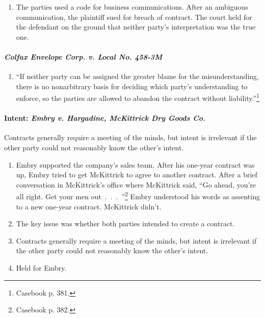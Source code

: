 \begin{enumerate}
    \item The parties used a code for business communications. After an 
    ambiguous communication, the plaintiff sued for breach of contract. The 
    court held for the defendant on the ground that neither party's 
    interpretation was the true one.
\end{enumerate}

\paragraph{\emph{Colfax Envelope Corp. v. Local No. 458-3M}}

\begin{enumerate}
    \item ``If neither party can be assigned the greater blame for the 
    misunderstanding, there is no nonarbitrary basis for deciding which 
    party's understanding to enforce, so the parties are allowed to abandon 
    the contract without liability.''\footnote{Casebook p. 381.}
\end{enumerate}

\paragraph{Intent: \emph{Embry v. Hargadine, McKittrick Dry Goods Co.}}

Contracts generally require a meeting of the minds, but intent is irrelevant 
if the other party could not reasonably know the other's intent.

\begin{enumerate}
    \item Embry supported the company's sales team. After his one-year 
    contract was up, Embry tried to get McKittrick to agree to another 
    contract. After a brief conversation in McKittrick's office where 
    McKittrick said, ``Go ahead, you're all right. Get your men 
    out~.~.~.~''\footnote{Casebook p. 382.} Embry understood his words as 
    assenting to a new one-year contract. McKittrick didn't.
    \item The key issue was whether both parties intended to create a 
    contract.
    \item Contracts generally require a meeting of the minds, but intent is 
    irrelevant if the other party could not reasonably know the other's 
    intent.
    \item Held for Embry.
\end{enumerate}

